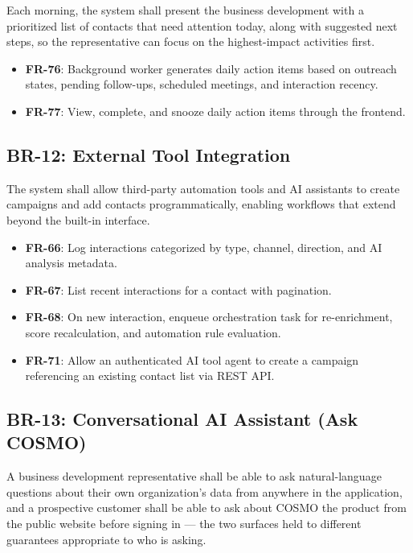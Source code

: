 \documentclass[a4paper]{article}
\begin{document}
Each morning, the system shall present the business development
with a prioritized list of contacts that need attention today,
along with suggested next steps, so the representative can focus
on the highest-impact activities first.

\begin{itemize}
    \item \textbf{FR-76}: Background worker generates daily action
    items based on outreach states, pending follow-ups, scheduled
    meetings, and interaction recency.
    \item \textbf{FR-77}: View, complete, and snooze daily action
    items through the frontend.
\end{itemize}

\subsection{BR-12: External Tool Integration}

The system shall allow third-party automation tools and AI assistants
to create campaigns and add contacts programmatically, enabling
workflows that extend beyond the built-in interface.

\begin{itemize}
    \item \textbf{FR-66}: Log interactions categorized by type,
    channel, direction, and AI analysis metadata.
    \item \textbf{FR-67}: List recent interactions for a contact
    with pagination.
    \item \textbf{FR-68}: On new interaction, enqueue orchestration
    task for re-enrichment, score recalculation, and automation
    rule evaluation.
    \item \textbf{FR-71}: Allow an authenticated AI tool agent to
    create a campaign referencing an existing contact list via
    REST API.
\end{itemize}

\subsection{BR-13: Conversational AI Assistant (Ask COSMO)}

A business development representative shall be able to ask
natural-language questions about their own organization's data from
anywhere in the application, and a prospective customer shall be able
to ask about COSMO the product from the public website before signing
in --- the two surfaces held to different guarantees appropriate to
who is asking.
\end{document}
